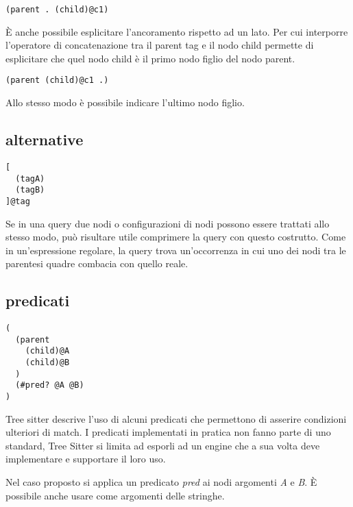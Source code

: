 \begin{lstlisting}
(parent . (child)@c1)
\end{lstlisting}

\`E anche possibile esplicitare l'ancoramento rispetto ad un lato.
Per cui interporre l'operatore di concatenazione tra il parent tag e il nodo child permette di esplicitare che quel nodo child \`e il primo nodo figlio del nodo parent.

\begin{lstlisting}
(parent (child)@c1 .)
\end{lstlisting}

Allo stesso modo \`e possibile indicare l'ultimo nodo figlio.

\subsection{alternative}

\begin{lstlisting}
[
  (tagA)
  (tagB)
]@tag
\end{lstlisting}

Se in una query due nodi o configurazioni di nodi possono essere trattati allo stesso modo, pu\`o risultare utile comprimere la query con questo costrutto.
Come in un'espressione regolare, la query trova un'occorrenza in cui uno dei nodi tra le parentesi quadre combacia con quello reale.


\subsection{predicati}

\begin{lstlisting}
(
  (parent
    (child)@A
    (child)@B
  )
  (#pred? @A @B)
)
\end{lstlisting}

Tree sitter descrive l'uso di alcuni predicati che permettono di asserire condizioni ulteriori di match.
I predicati implementati in pratica non fanno parte di uno standard, Tree Sitter si limita ad esporli ad un engine che a sua volta deve implementare e supportare il loro uso.

Nel caso proposto si applica un predicato \emph{pred} ai nodi argomenti \emph{A} e \emph{B}.
\`E possibile anche usare come argomenti delle stringhe.
